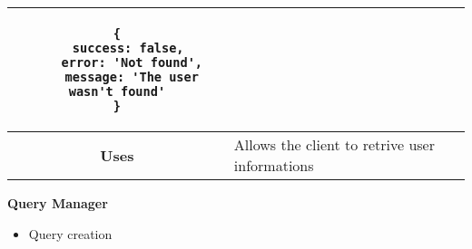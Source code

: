 \begin{adjustwidth}{1cm}{}
\begin{longtable}{|c|l|}
\begin{minipage}[t]{0.7\textwidth}
                \begin{adjustwidth}{1.5cm}{}
                \begin{verbatim}
{
    success: false, 
    error: 'Not found',
    message: 'The user wasn't found'
}
                \end{verbatim}
                \end{adjustwidth}
              \end{minipage} \\
              \hline
            \textbf{Uses} & Allows the client to retrive user informations \\
            \hline
        \end{longtable}
    \end{adjustwidth}
   \textbf{Query Manager}
    
    \begin{itemize}
        \item Query creation
    \end{itemize}
